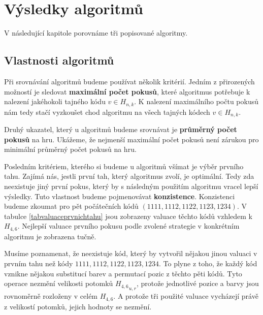 \chapter{Výsledky algoritmů}
V následující kapitole porovnáme tři popisované algoritmy. 

\section{Vlastnosti algoritmů}
Při srovnávání algoritmů budeme používat několik kritérií. Jedním z přirozených možností je sledovat \textbf{maximální počet pokusů}, které algoritmus potřebuje k nalezení jakéhokoli tajného kódu $v \in H_{n,k}$. K nalezení maximálního počtu pokusů nám tedy stačí vyzkoušet chod algoritmu na všech tajných kódech $v \in H_{n,k}$.

Druhý ukazatel, který u algoritmů budeme srovnávat je \textbf{průměrný počet pokusů} na hru. Ukážeme, že nejmenší maximální počet pokusů není zárukou pro minimální průměrný počet pokusů na hru. 

Posledním kritériem, kterého si budeme u algoritmů všímat je výběr prvního tahu. Zajímá nás, jestli první tah, který algoritmus zvolí, je optimální. Tedy zda neexistuje jiný první pokus, který by s následným použitím algoritmu vracel lepší výsledky. Tuto vlastnost budeme pojmenovávat \textbf{konzistence}.
Konzistenci budeme zkoumat pro pět počátečních kódů $(1111, 1112, 1122, 1123, 1234)$.
V tabulce \ref{tabvaluaceprvnichtahu} jsou zobrazeny valuace těchto kódů vzhledem k $H_{4,6}$. Nejlepší valuace prvního pokusu podle zvolené strategie v konkrétním algoritmu je zobrazena tučně. 

Musíme poznamenat, že neexistuje kód, který by vytvořil nějakou jinou valuaci v prvním tahu než kódy $1111, 1112, 1122, 1123, 1234$. To plyne z toho, že každý kód vznikne nějakou substitucí barev a permutací pozic z těchto pěti kódů. Tyto operace nezmění velikosti potomků ${H_{4,6}}_{u,r}$, protože jednotlivé pozice a barvy jsou rovnoměrně rozloženy v celém $H_{4,6}$. A protože tři použité valuace vycházejí právě z velikostí potomků, jejich hodnoty se nezmění. 

